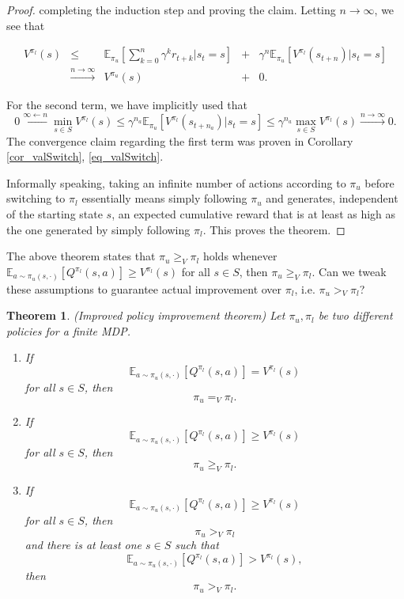 \documentclass[11pt]{article} %
\newtheorem{thm}{Theorem}
\begin{document}
\begin{proof}
	completing the induction step and proving the claim. Letting $n \rightarrow \infty$, we see that

	\[
		\begin{array}{rclcl}
			V^{\pi_l}(s) & \le & \mathbb{E}_{\pi_u}[\sum_{k=0}^{n} \gamma^k r_{t+k} | s_t = s] & + & \gamma^{n} \mathbb{E}_{\pi_u}[V^{\pi_l}(s_{t+n}) | s_t = s ] \\
						& \overset{n \rightarrow \infty}{\rightarrow } & V^{\pi_u}(s) & + & 0.
		\end{array}
	\]

	For the second term, we have implicitly used that $$0 \overset{\infty \leftarrow n}{\leftarrow} \min_{s \in S} V^{\pi_l}(s) \le \gamma^{n_a}\mathbb{E}_{\pi_u}[V^{\pi_l}(s_{t+n_a}) | s_t = s] \le \gamma^{n_a} \max_{s \in S} V^{\pi_l}(s) \overset{n \rightarrow \infty}{\rightarrow} 0.$$ The convergence claim regarding the first term was proven in Corollary \ref{cor_valSwitch}, \ref{eq_valSwitch}.

Informally speaking, taking an infinite number of actions according to $\pi_u$ before switching to $\pi_l$ essentially means simply following $\pi_u$ and generates, independent of the starting state $s$, an expected cumulative reward that is at least as high as the one generated by simply following $\pi_l$. This proves the theorem.

\end{proof}

The above theorem states that $\pi_u \ge_V \pi_l$ holds whenever $ \mathbb{E}_{a \sim \pi_u(s,\cdot )}[Q^{\pi_l}(s,a)] \ge V^{\pi_l}(s)$ for all $s \in S$, then $\pi_u \ge_V \pi_l.$ Can we tweak these assumptions to guarantee actual improvement over $\pi_l$, i.e. $\pi_u >_V \pi_l$?

\begin{thm}{(Improved policy improvement theorem)}
	Let $\pi_u, \pi_l$ be two different policies for a finite MDP.
	\begin{enumerate}
		\item If $$ \mathbb{E}_{a \sim \pi_u(s,\cdot )}[Q^{\pi_l}(s,a)] = V^{\pi_l}(s)$$ for all $s \in S$, then $$\pi_u =_V \pi_l.$$
		\item If $$ \mathbb{E}_{a \sim \pi_u(s,\cdot )}[Q^{\pi_l}(s,a)] \ge V^{\pi_l}(s)$$ for all $s \in S$, then $$\pi_u \ge_V \pi_l.$$
		\item If $$ \mathbb{E}_{a \sim \pi_u(s,\cdot )}[Q^{\pi_l}(s,a)] \ge V^{\pi_l}(s)$$ for all $s \in S$, then $$\pi_u >_V \pi_l$$ and there is at least one $s \in S$ such that $$ \mathbb{E}_{a \sim \pi_u(s,\cdot )}[Q^{\pi_l}(s,a)] > V^{\pi_l}(s),$$ then $$\pi_u >_V \pi_l.$$
	\end{enumerate}
\end{thm}
\end{document}
